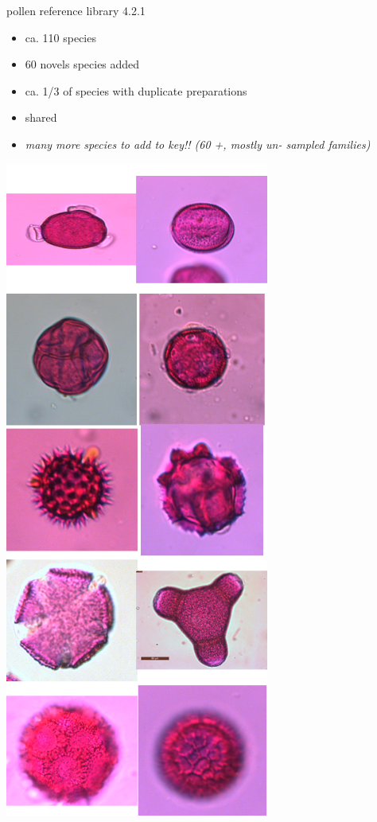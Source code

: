 \documentclass[
  ignorenonframetext,
]{beamer}
\providecommand{\tightlist}{%
  \setlength{\itemsep}{0pt}\setlength{\parskip}{0pt}}
\begin{document}
\begin{frame}{pollen reference library 4.2.1}
\protect\hypertarget{pollen-reference-library-4.2.1}{}
\begin{itemize}
\tightlist
\item
  ca. 110 species
\item
  60 novels species added
\item
  ca. 1/3 of species with duplicate preparations
\item
  shared
\item
  \emph{many more species to add to key!! (60 +, mostly un- sampled
  families)}
\end{itemize}

\includegraphics[width=0.65\textwidth,height=\textheight]{../graphics/pictures/pollen_montage.png}
\end{frame}
\end{document}
